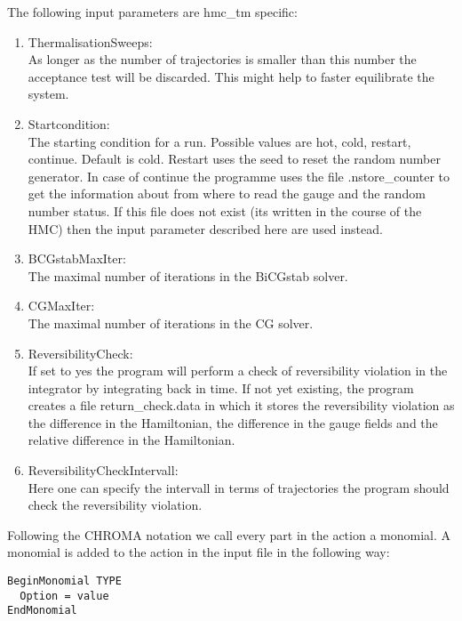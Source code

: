 The following input parameters are {\ttfamily hmc\_tm} specific:
\begin{enumerate}
\item {ThermalisationSweeps}:\\
  As longer as the number of trajectories is smaller than this number
  the acceptance test will be discarded. This might help to faster
  equilibrate the system.

\item {\ttfamily Startcondition}:\\
  The starting condition for a run. Possible values are {\ttfamily
    hot, cold, restart, continue}. Default is {\ttfamily
    cold}. Restart uses the seed to reset the random number
  generator. In case of {\ttfamily continue} the programme uses the
  file {\ttfamily .nstore\_counter} to get the information about from
  where to read the gauge and the random number status. If this file
  does not exist (its written in the course of the HMC) then the input
  parameter described here are used instead.

\item {\ttfamily BCGstabMaxIter}:\\
  The maximal number of iterations in the BiCGstab solver.

\item {\ttfamily CGMaxIter}:\\
  The maximal number of iterations in the CG solver.

\item {\ttfamily ReversibilityCheck}:\\
  If set to {\ttfamily yes} the program will perform a check of
  reversibility violation in the integrator by integrating back in
  time. If not yet existing, the program creates a file {\ttfamily
    return\_check.data} in which it stores the reversibility violation
  as the difference in the Hamiltonian, the difference in the gauge
  fields and the relative difference in the Hamiltonian.

\item {\ttfamily ReversibilityCheckIntervall}:\\
  Here one can specify the intervall in terms of trajectories the
  program should check the reversibility violation.

\end{enumerate}
Following the CHROMA notation we call every part in the action a
monomial. A monomial is added to the action in the input file in the
following way:
\begin{verbatim}
BeginMonomial TYPE
  Option = value
EndMonomial
\end{verbatim}
